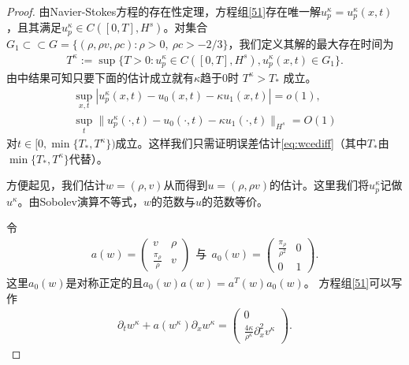 \begin{proof}
由Navier-Stokes方程的存在性定理\cite{kawashima1984phd}，方程组\eqref{51}存在唯一解$u^\kappa_p=u^\kappa_p(x,t)$，且其满足$u^\kappa_p \in C([0,T],H^s)$。对集合$G_1\subset\subset G= \{(\rho, \rho v, \rho c): \rho>0,\ \rho c > -2/3\}$，我们定义其解的最大存在时间为
\begin{eqnarray*}
  T^\kappa :=\sup \{T>0 : u_p^\kappa  \in C([0,T],H^s), u^\kappa_p(x,t) \in G_1 \}.
\end{eqnarray*}
由\cite{yong2001basic}中结果可知只要下面的估计成立就有$\kappa$趋于$0$时
$T^\kappa > T_*$
成立。
\begin{eqnarray*}
\sup_{x,t} |u_p^\kappa(x,t) - u_0 (x, t) - \kappa u_1(x,t)|=o(1), \\
\sup_t \| u_p^\kappa(\cdot ,t) - u_0 (\cdot, t) - \kappa u_1(\cdot, t) \|_{H^s} = O(1)
\end{eqnarray*}
对$t \in [0,\min\{T_*,T^\kappa\})$成立。这样我们只需证明误差估计\eqref{eq:wcediff}（其中$T_*$由$\min\{T_*,T^\kappa\}$代替）。

方便起见，我们估计$w=(\rho,v)$从而得到$u=(\rho,\rho v)$的估计。这里我们将$u^\kappa_p$记做$u^\kappa$。由Sobolev演算不等式\cite{majda1984compressible}，$w$的范数与$u$的范数等价。

令
\begin{eqnarray*}
  a(w) = \left( \begin{array}{cc} v & \rho \\ \frac{\pi_\rho}{\rho} & v \end{array} \right) \ \ \mbox{与} \ \
  a_0(w) = \left( \begin{array}{cc} \frac{\pi_\rho}{\rho^2} & 0 \\ 0 & 1 \end{array} \right).
\end{eqnarray*}
这里$a_0(w)$是对称正定的且$a_0(w)a(w)=a^T(w)a_0(w)$。
方程组\eqref{51}可以写作
\begin{eqnarray}\label{57}
  \partial_t w^\kappa + a(w^\kappa) \partial_x w^\kappa = \left( \begin{array}{cc} 0 \\ \frac{4 \kappa}{\rho^\kappa} \partial^2_x v^\kappa \end{array} \right) .
\end{eqnarray}


\end{proof}
